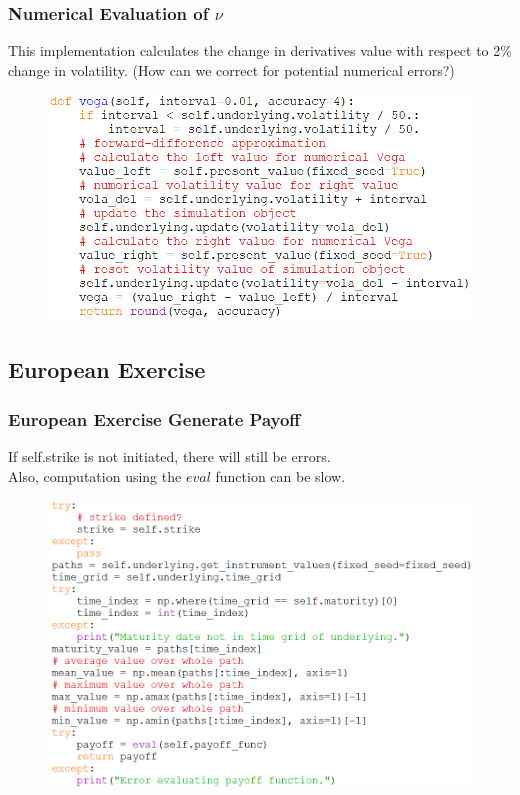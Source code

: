 \documentclass{beamer}
\begin{document}
\begin{frame}
\frametitle{Numerical Evaluation of $\nu$}
This implementation calculates the change in derivatives value with respect to 2\% change in volatility. (How can we correct for potential numerical errors?)
\begin{figure}[H]
	\includegraphics[scale=0.45]{vega_valuation_class.png}
\end{figure}
\end{frame}

\subsection{European Exercise}
\begin{frame}
\frametitle{European Exercise Generate Payoff}
If self.strike is not initiated, there will still be errors.\\
Also, computation using the $eval$ function can be slow.
\begin{figure}[H]
	\includegraphics[scale=0.39]{european_generate_payoff.png}
\end{figure}
\end{frame}
\end{document}
